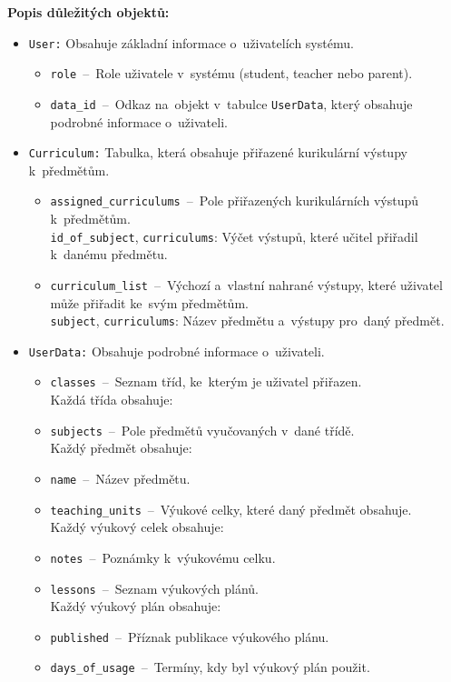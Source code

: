 \documentclass[male,czech,api_bc]{kitheses}
\begin{document}
\textbf{Popis důležitých objektů:}
\begin{itemize}
	\item \texttt{User:} Obsahuje základní informace o~uživatelích systému.
	\begin{itemize}
		\item \texttt{role}~--~Role uživatele v~systému (student, teacher nebo parent).
		\item \texttt{data\_id}~--~Odkaz na~objekt v~tabulce \texttt{UserData}, který obsahuje podrobné informace o~uživateli.
	\end{itemize}
	
	\item \texttt{Curriculum:} Tabulka, která obsahuje přiřazené kurikulární výstupy k~předmětům.
	\begin{itemize}
		\item \texttt{assigned\_curriculums}~--~Pole přiřazených kurikulárních výstupů k~předmětům. 
		\\\texttt{id\_of\_subject}, \texttt{curriculums}: Výčet výstupů, které učitel přiřadil k~danému předmětu.
		\item \texttt{curriculum\_list}~--~Výchozí a~vlastní nahrané výstupy, které uživatel může přiřadit ke~svým předmětům.
		\\\texttt{subject}, \texttt{curriculums}: Název předmětu a~výstupy pro~daný předmět.
	\end{itemize}
	
	\item \texttt{UserData:} Obsahuje podrobné informace o~uživateli.
	\begin{itemize}
		\item \texttt{classes}~--~Seznam tříd, ke~kterým je uživatel přiřazen.
		\\Každá třída obsahuje:
		\item \texttt{subjects}~--~Pole předmětů vyučovaných v~dané třídě.
		\\Každý předmět obsahuje:
		\item \texttt{name}~--~Název předmětu.
		\item \texttt{teaching\_units}~--~Výukové celky, které daný předmět obsahuje.
		\\Každý výukový celek obsahuje:
		\item \texttt{notes}~--~Poznámky k~výukovému celku.
		\item \texttt{lessons}~--~Seznam výukových plánů.
		\\Každý výukový plán obsahuje:
		\item \texttt{published}~--~Příznak publikace výukového plánu.
		\item \texttt{days\_of\_usage}~--~Termíny, kdy byl výukový plán použit.
	\end{itemize}
	

\end{itemize}
\end{document}

